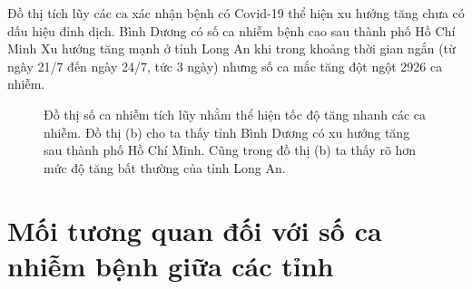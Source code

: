 \documentclass[../thesis.tex]{subfiles}
\begin{document}
Đồ thị tích lũy các ca xác nhận bệnh có Covid-19 thể hiện xu hướng tăng chưa có dấu hiệu đỉnh dịch. Bình Dương có số ca nhiễm bệnh cao sau thành phố Hồ Chí Minh Xu hướng tăng mạnh ở tỉnh Long An khi trong khoảng thời gian ngắn (từ ngày 21/7 đến ngày 24/7, tức 3 ngày) nhưng số ca mắc tăng đột ngột 2926 ca nhiễm. 
\begin{figure}
			\caption[Đồ thị số ca nhiễm tích lũy]{Đồ thị số ca nhiễm tích lũy nhằm thể hiện tốc độ tăng nhanh các ca nhiễm. Đồ thị (b) cho ta thấy tỉnh Bình Dương có xu hướng tăng sau thành phố Hồ Chí Minh. Cũng trong đồ thị (b) ta thấy rõ hơn mức độ tăng bất thường của tỉnh Long An.\label{fig:cul}}
\end{figure}





\newpage
\section{Mối tương quan đối với số ca nhiễm bệnh giữa các tỉnh}
\end{document}
